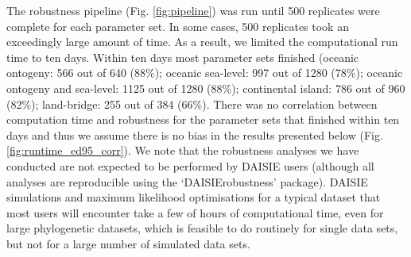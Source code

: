 \documentclass{article}
\begin{document}
The robustness pipeline (Fig. \ref{fig:pipeline}) was run until 500 replicates were complete for each parameter set. In some cases, 500 replicates took an exceedingly large amount of time. As a result, we limited the computational run time to ten days. Within ten days most parameter sets finished (oceanic ontogeny: 566 out of 640 (88\%); oceanic sea-level: 997 out of 1280 (78\%); oceanic ontogeny and sea-level: 1125 out of 1280 (88\%); continental island: 786 out of 960 (82\%); land-bridge: 255 out of 384 (66\%). There was no correlation between computation time and robustness for the parameter sets that finished within ten days and thus we assume there is no bias in the results presented below (Fig. \ref{fig:runtime_ed95_corr}). We note that the robustness analyses we have conducted are not expected to be performed by DAISIE users (although all analyses are reproducible using the `DAISIErobustness' package). DAISIE simulations and maximum likelihood optimisations for a typical dataset that most users will encounter take a few of hours of computational time, even for large phylogenetic datasets, which is feasible to do routinely for single data sets, but not for a large number of simulated data sets.

\clearpage
\end{document}
